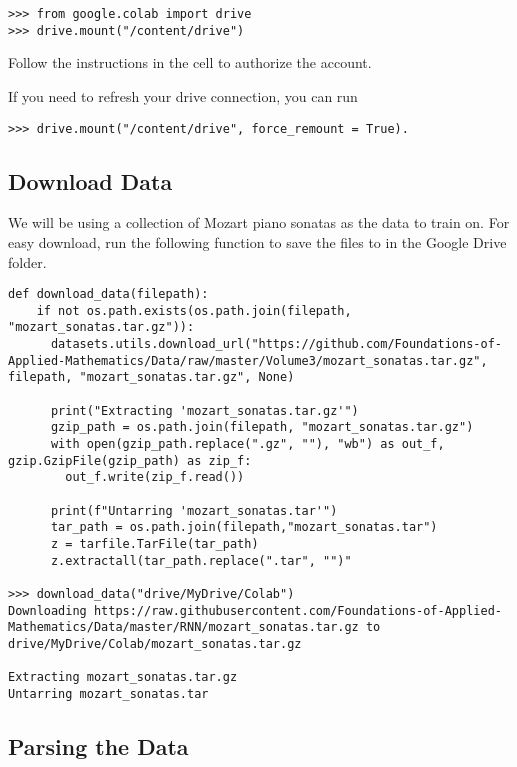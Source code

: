 \begin{lstlisting}
>>> from google.colab import drive
>>> drive.mount("/content/drive")
\end{lstlisting}

Follow the instructions in the cell to authorize the account.

If you need to refresh your drive connection, you can run
\begin{lstlisting}
>>> drive.mount("/content/drive", force_remount = True).
\end{lstlisting}


\subsection*{Download Data}
We will be using a collection of Mozart piano sonatas as the data to train on.
For easy download, run the following function to save the files to  in the Google Drive folder.


\begin{lstlisting}
def download_data(filepath):
    if not os.path.exists(os.path.join(filepath, "mozart_sonatas.tar.gz")):
      datasets.utils.download_url("https://github.com/Foundations-of-Applied-Mathematics/Data/raw/master/Volume3/mozart_sonatas.tar.gz", filepath, "mozart_sonatas.tar.gz", None)

      print("Extracting 'mozart_sonatas.tar.gz'")
      gzip_path = os.path.join(filepath, "mozart_sonatas.tar.gz")
      with open(gzip_path.replace(".gz", ""), "wb") as out_f, gzip.GzipFile(gzip_path) as zip_f:
        out_f.write(zip_f.read())

      print(f"Untarring 'mozart_sonatas.tar'")
      tar_path = os.path.join(filepath,"mozart_sonatas.tar")
      z = tarfile.TarFile(tar_path)
      z.extractall(tar_path.replace(".tar", "")"

>>> download_data("drive/MyDrive/Colab")
Downloading https://raw.githubusercontent.com/Foundations-of-Applied-Mathematics/Data/master/RNN/mozart_sonatas.tar.gz to drive/MyDrive/Colab/mozart_sonatas.tar.gz

Extracting mozart_sonatas.tar.gz
Untarring mozart_sonatas.tar
\end{lstlisting}

\vspace{5mm}
\subsection*{Parsing the Data}

